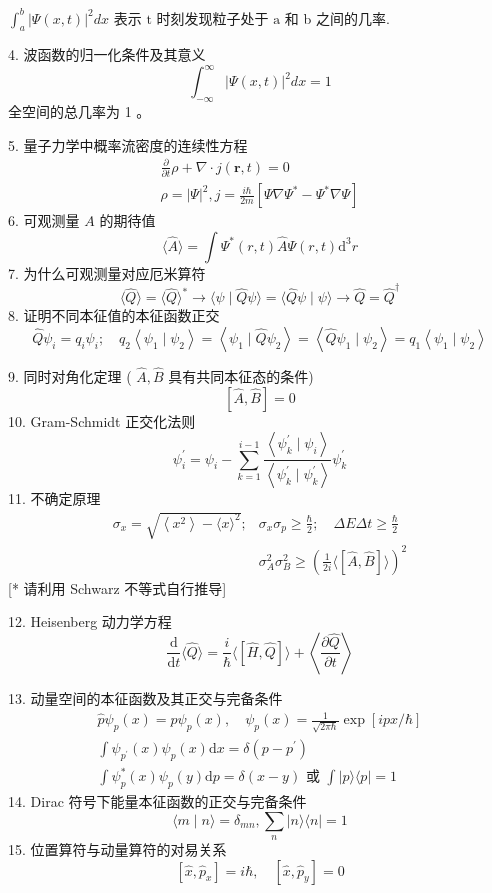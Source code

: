 \documentclass[../../note.tex]{subfiles}
\begin{document}
$\int_a^b|\Psi(x, t)|^2 d x$ 表示 $\mathrm{t}$ 时刻发现粒子处于 $\mathrm{a}$ 和 b 之间的几率.

4. 波函数的归一化条件及其意义
$$
\int_{-\infty}^{\infty}|\Psi(x, t)|^2 d x=1
$$
全空间的总几率为 1 。

5. 量子力学中概率流密度的连续性方程
$$
\begin{array}{r}
\frac{\partial}{\partial t} \rho+\nabla \cdot j(\boldsymbol{r}, t)=0 \\
\rho=|\Psi|^2, j=\frac{i \hbar}{2 m}\left[\Psi \nabla \Psi^*-\Psi^* \nabla \Psi\right]
\end{array}
$$
6. 可观测量 $A$ 的期待值
$$
\langle\hat{A}\rangle=\int \Psi^*(r, t) \hat{A} \Psi(r, t) \mathrm{d}^3 r
$$
7. 为什么可观测量对应厄米算符
$$
\langle\hat{Q}\rangle=\langle\hat{Q}\rangle^* \rightarrow\langle\psi \mid \hat{Q} \psi\rangle=\langle\hat{Q} \psi \mid \psi\rangle \rightarrow \hat{Q}=\hat{Q}^{\dagger}
$$
8. 证明不同本征值的本征函数正交
$$
\hat{Q} \psi_i=q_i \psi_i ; \quad q_2\left\langle\psi_1 \mid \psi_2\right\rangle=\left\langle\psi_1 \mid \hat{Q} \psi_2\right\rangle=\left\langle\hat{Q} \psi_1 \mid \psi_2\right\rangle=q_1\left\langle\psi_1 \mid \psi_2\right\rangle
$$

9. 同时对角化定理 ( $\hat{A}, \hat{B}$ 具有共同本征态的条件)
$$
[\hat{A}, \hat{B}]=0
$$
10. Gram-Schmidt 正交化法则
$$
\psi_i^{\prime}=\psi_i-\sum_{k=1}^{i-1} \frac{\left\langle\psi_k^{\prime} \mid \psi_i\right\rangle}{\left\langle\psi_k^{\prime} \mid \psi_k^{\prime}\right\rangle} \psi_k^{\prime}
$$
11. 不确定原理
$$
\begin{array}{rr}
\sigma_x=\sqrt{\left\langle x^2\right\rangle-\langle x\rangle^2} ; & \sigma_x \sigma_p \geq \frac{\hbar}{2} ; \quad \Delta E \Delta t \geq \frac{\hbar}{2} \\
& \sigma_A^2 \sigma_B^2 \geq\left(\frac{1}{2 i}\langle[\hat{A}, \hat{B}]\rangle\right)^2
\end{array}
$$
[* 请利用 Schwarz 不等式自行推导]

12. Heisenberg 动力学方程
$$
\frac{\mathrm{d}}{\mathrm{d} t}\langle\hat{Q}\rangle=\frac{i}{\hbar}\langle[\hat{H}, \hat{Q}]\rangle+\left\langle\frac{\partial \hat{Q}}{\partial t}\right\rangle
$$

13. 动量空间的本征函数及其正交与完备条件
$$
\begin{array}{r}
\hat{p} \psi_p(x)=p \psi_p(x), \quad \psi_p(x)=\frac{1}{\sqrt{2 \pi \hbar}} \exp [i p x / \hbar] \\
\int \psi_{p^{\prime}}(x) \psi_p(x) \mathrm{d} x=\delta\left(p-p^{\prime}\right) \\
\int \psi_p^*(x) \psi_p(y) \mathrm{d} p=\delta(x-y) \text { 或 } \int|p\rangle\langle p|=1
\end{array}
$$
14. Dirac 符号下能量本征函数的正交与完备条件
$$
\langle m \mid n\rangle=\delta_{m n}, \sum_n|n\rangle\langle n|=1
$$
15. 位置算符与动量算符的对易关系
$$
\left[\hat{x}, \hat{p}_x\right]=i \hbar, \quad\left[\hat{x}, \hat{p}_y\right]=0
$$
\end{document}
